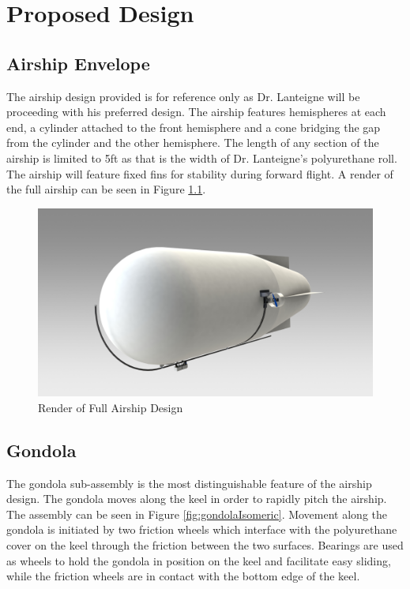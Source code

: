 \documentclass[../main.tex]{subfiles}
\begin{document}
\chapter{Proposed Design}
\section{Airship Envelope}
The airship design provided is for reference only as Dr. Lanteigne will be proceeding with his preferred design. The airship features hemispheres at each end, a cylinder attached to the front hemisphere and a cone bridging the gap from the cylinder and the other hemisphere. The length of any section of the airship is limited to 5ft as that is the width of Dr. Lanteigne's polyurethane roll. The airship will feature fixed fins for stability during forward flight. A render of the full airship can be seen in Figure \ref{fig:fullAirship}. 

\begin{figure}[H]
	\centering
	\includegraphics[width=\textwidth]{img/design/fullAirshipPerspective.JPG}
	\caption{Render of Full Airship Design}
	\label{fig:fullAirship}
\end{figure}

\section{Gondola}
The gondola sub-assembly is the most distinguishable feature of the airship design. The gondola moves along the keel in order to rapidly pitch the airship. The assembly can be seen in  Figure \ref{fig:gondolaIsomeric}. Movement along the gondola is initiated by two friction wheels which interface with the polyurethane cover on the keel through the friction between the two surfaces. Bearings are used as wheels to hold the gondola in position on the keel and facilitate easy sliding, while the friction wheels are in contact with the bottom edge of the keel. 
\end{document}
